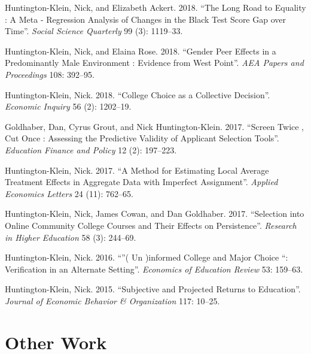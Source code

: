 \documentclass[11pt,a4paper,serif]{moderncv}
\begin{document}
 \begin{hangparas}{.25in}{1} 
 Huntington-Klein, Nick, and Elizabeth Ackert. 2018. ``The Long Road to Equality : A Meta - Regression Analysis of Changes in the Black Test Score Gap over Time''. \emph{Social Science Quarterly} 99 (3): 1119--33.



Huntington-Klein, Nick, and Elaina Rose. 2018. ``Gender Peer Effects in a Predominantly Male Environment : Evidence from West Point''. \emph{AEA Papers and Proceedings} 108: 392--95.



Huntington-Klein, Nick. 2018. ``College Choice as a Collective Decision''. \emph{Economic Inquiry} 56 (2): 1202--19.



Goldhaber, Dan, Cyrus Grout, and Nick Huntington-Klein. 2017. ``Screen Twice , Cut Once : Assessing the Predictive Validity of Applicant Selection Tools''. \emph{Education Finance and Policy} 12 (2): 197--223.



Huntington-Klein, Nick. 2017. ``A Method for Estimating Local Average Treatment Effects in Aggregate Data with Imperfect Assignment''. \emph{Applied Economics Letters} 24 (11): 762--65.



Huntington-Klein, Nick, James Cowan, and Dan Goldhaber. 2017. ``Selection into Online Community College Courses and Their Effects on Persistence''. \emph{Research in Higher Education} 58 (3): 244--69.



Huntington-Klein, Nick. 2016. ``''( Un )informed College and Major Choice ``: Verification in an Alternate Setting''. \emph{Economics of Education Review} 53: 159--63.



Huntington-Klein, Nick. 2015. ``Subjective and Projected Returns to Education''. \emph{Journal of Economic Behavior \& Organization} 117: 10--25.

 
 \end{hangparas}


\section{Other Work}  
  
\end{document}
